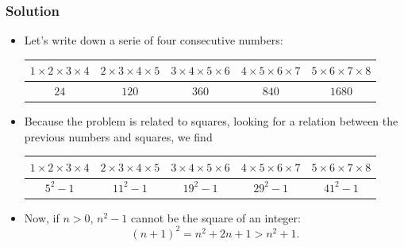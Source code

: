 \documentclass{beamer}
\newcounter{exo}
\newcommand{\exo}{
  \addtocounter{exo}{1}
  Exercice \arabic{exo}
}
\begin{document}
\fi


\ifanswers

\begin{frame}%
\frametitle{Solution}

\scriptsize

\begin{itemize}

\item<1-> Let's write down a serie of four consecutive numbers:\\

\vspace{0.3cm}

\begin{tabular}{|c|c|c|c|c|}
\hline
$1\times2\times3\times4$ & $2\times3\times4\times5$ & $3\times4\times5\times6$ & $4\times5\times6\times7$ & $5\times6\times7\times8$\\
\hline
$24$ & $120$ & $360$ & $840$ & $1680$\\
\hline
\end{tabular}

\vspace{0.3cm}

\item<2-> Because the problem is related to squares, looking for a relation between the previous numbers
and squares, we find\\

\vspace{0.3cm}

\begin{tabular}{|c|c|c|c|c|}
\hline
$1\times2\times3\times4$ & $2\times3\times4\times5$ & $3\times4\times5\times6$ & $4\times5\times6\times7$ & $5\times6\times7\times8$\\
\hline
$5^2 - 1$ & $11^2 - 1$ & $19^2 - 1$ & $29^2 - 1$ & $41^2 - 1$\\
\hline
\end{tabular}
\vspace{0.3cm}

\item<3-> Now, if $n>0$, $n^2 - 1$ cannot be the square of an integer:
$$
(n+1)^2 = n^2 + 2n + 1 > n^2 + 1.
$$

\end{itemize}

\end{frame}
\end{document}
